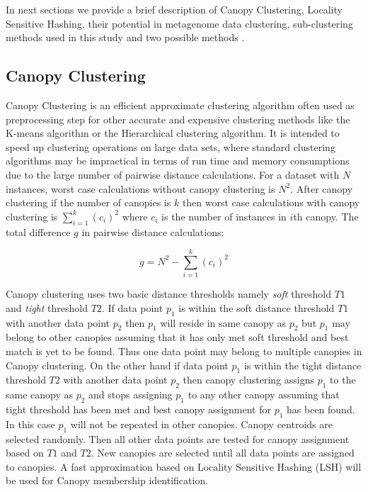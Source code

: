 \documentclass[10pt, conference, compsocconf]{IEEEtran}
\begin{document}
In next sections we provide a brief description of Canopy Clustering, Locality Sensitive Hashing, their potential in metagenome data clustering, sub-clustering methods used in this study and two possible methods .  

\subsection{\textbf{Canopy Clustering}}

Canopy Clustering \cite{MARCanopy} is an efficient approximate clustering algorithm often used as preprocessing step for other accurate and expensive clustering methods like the K-means algorithm or the Hierarchical clustering algorithm. It is intended to speed up clustering operations on large data sets, where standard clustering algorithms may be impractical in terms of run time and memory consumptions due to the large number of pairwise distance calculations. For a dataset with $N$ instances, worst case calculations without canopy clustering is $N^2$. After canopy clustering if the number of canopies is $k$ then worst case calculations with canopy clustering is $\sum_{i=1}^{k}(c_i)^2$ where $c_i$ is the number of instances in $i$th canopy. The total difference $g$ in pairwise distance calculations:

\begin{equation}
g=N^2-\sum_{i=1}^{k}(c_i)^2
\end{equation} 

Canopy clustering uses two basic distance thresholds namely \textit{soft} threshold $T1$ and \textit{tight} threshold $T2$. If data point $p_1$ is within the soft distance threshold $T1$ with another data point $p_2$ then $p_1$ will reside in same canopy as $p_2$ but $p_1$ may belong to other canopies assuming that it has only met soft threshold and best match is yet to be found. Thus one data point may belong to multiple canopies in Canopy clustering. On the other hand if data point $p_1$ is within the tight distance threshold $T2$ with another data point $p_2$ then canopy clustering assigns $p_1$ to the same canopy as $p_2$ and stops assigning $p_1$ to any other canopy assuming that tight threshold has been met and best canopy assignment for $p_1$ has been found. In this case $p_1$ will not be repeated in other canopies. Canopy centroids are selected randomly. Then all other data points are tested for canopy assignment based on $T1$ and $T2$. New canopies are selected until all data points are assigned to canopies. A fast approximation based on Locality Sensitive Hashing (LSH) will be used for Canopy membership identification.
\end{document}
